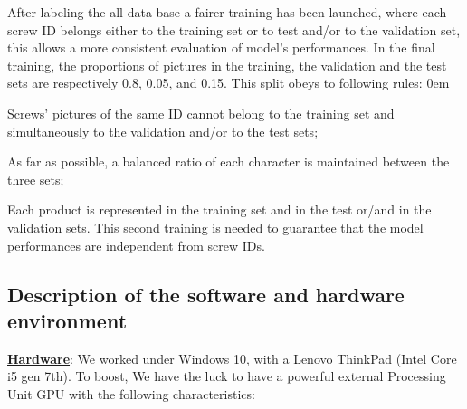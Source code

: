 \documentclass[12pt, french, a4paper]{article} %
\let\tempone\itemize
\let\temptwo\enditemize
\renewenvironment{itemize}{\tempone\addtolength{\itemsep}{-0.3\baselineskip}}{\temptwo}
\begin{document}
After labeling the all data base a fairer training has been launched, where each screw ID belongs either to the training set or to test and/or to the validation set, this allows a more consistent evaluation of model's performances. In the final training, the proportions of pictures in the training, the validation and the test sets are respectively 0.8, 0.05, and 0.15. This split obeys to following rules:
\begin{itemize}
\itemsep0em 
 \item Screws' pictures of the same ID cannot belong to the training set and simultaneously to the validation and/or to the test sets;
\item As far as possible, a balanced ratio of each character is maintained between the three sets;
\item Each product is represented in the training set and in the test or/and in the validation sets. 
\end{itemize}
This second training is needed to guarantee that the model performances are independent from screw IDs.
\subsection{Description of the software and hardware environment}
\textbf{\underline{Hardware}}: We worked under Windows 10, with a Lenovo ThinkPad (Intel Core i5 gen 7th). To boost, We have the luck to have a powerful external Processing Unit \gls{GPU} with the following characteristics:
\end{document}
